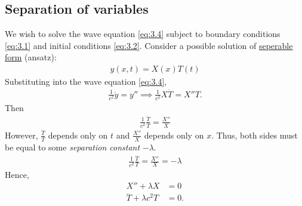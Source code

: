 \subsection{Separation of variables}
We wish to solve the wave equation \cref{eq:3.4} subject to  boundary conditions \cref{eq:3.1} and initial conditions \cref{eq:3.2}.
Consider a possible solution of \underline{seperable form} (ansatz):
\begin{align} \label{eq:3.5}
	y(x,t) = X(x) T(t)
\end{align}
Substituting into the wave equation \cref{eq:3.4},
\begin{align*}
	\frac{1}{c^2} \ddot y = y'' \implies \frac{1}{c^2} X \ddot T = X'' T.
\end{align*}
Then
\begin{align*}
	\frac{1}{c^2}\frac{\ddot T}{T} = \frac{X''}{X}
\end{align*}
However, $\frac{\ddot T}{T}$ depends only on $t$ and $\frac{X''}{X}$ depends only on $x$.
Thus, both sides must be equal to some \textit{separation constant} $-\lambda$.
\begin{align*}
	\frac{1}{c^2}\frac{\ddot T}{T} = \frac{X''}{X} = -\lambda
\end{align*}
Hence,
\begin{align}
	X'' + \lambda X &= 0 \label{eq:3.6} \\ 
	\ddot T + \lambda c^2 T &= 0. \label{eq:3.7}
\end{align}

